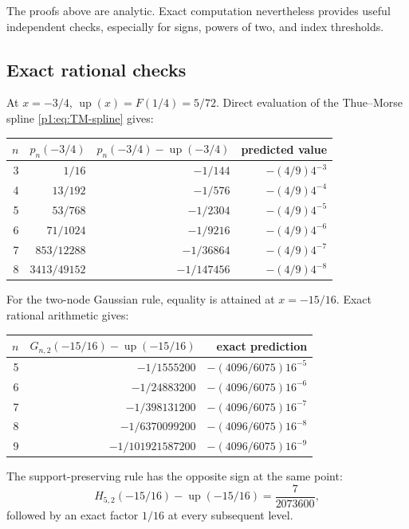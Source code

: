 \documentclass[11pt]{article}
\numberwithin{equation}{section}
\theoremstyle{definition}
\theoremstyle{remark}
\newcommand{\Up}{\operatorname{up}}
\begin{document}
The proofs above are analytic.  Exact computation nevertheless provides useful independent checks, especially for signs, powers of two, and index thresholds.

\subsection{Exact rational checks}

At $x=-3/4$, $\Up(x)=F(1/4)=5/72$.  Direct evaluation of the Thue--Morse spline \eqref{p1:eq:TM-spline} gives:

\begin{center}
\begin{tabular}{@{}rrrr@{}}
\toprule
$n$ & $p_n(-3/4)$ & $p_n(-3/4)-\Up(-3/4)$ & predicted value\\
\midrule
3 & $1/16$ & $-1/144$ & $-(4/9)4^{-3}$\\
4 & $13/192$ & $-1/576$ & $-(4/9)4^{-4}$\\
5 & $53/768$ & $-1/2304$ & $-(4/9)4^{-5}$\\
6 & $71/1024$ & $-1/9216$ & $-(4/9)4^{-6}$\\
7 & $853/12288$ & $-1/36864$ & $-(4/9)4^{-7}$\\
8 & $3413/49152$ & $-1/147456$ & $-(4/9)4^{-8}$\\
\bottomrule
\end{tabular}
\end{center}

For the two-node Gaussian rule, equality is attained at $x=-15/16$.  Exact rational arithmetic gives:

\begin{center}
\begin{tabular}{@{}rrr@{}}
\toprule
$n$ & $G_{n,2}(-15/16)-\Up(-15/16)$ & exact prediction\\
\midrule
5 & $-1/1555200$ & $-(4096/6075)16^{-5}$\\
6 & $-1/24883200$ & $-(4096/6075)16^{-6}$\\
7 & $-1/398131200$ & $-(4096/6075)16^{-7}$\\
8 & $-1/6370099200$ & $-(4096/6075)16^{-8}$\\
9 & $-1/101921587200$ & $-(4096/6075)16^{-9}$\\
\bottomrule
\end{tabular}
\end{center}

The support-preserving rule has the opposite sign at the same point:
\begin{equation}
 H_{5,2}(-15/16)-\Up(-15/16)=\frac7{2073600},
 \label{p1:eq:H52-check}
\end{equation}
followed by an exact factor $1/16$ at every subsequent level.
\end{document}
